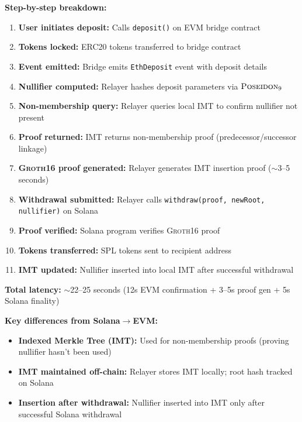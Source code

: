 \documentclass[11pt,a4paper,twoside]{article}
\newcommand{\poseidon}{\textsc{Poseidon}}
\newcommand{\groth}{\textsc{Groth16}}
\begin{document}
\textbf{Step-by-step breakdown:}
\begin{enumerate}
    \item \textbf{User initiates deposit:} Calls \texttt{deposit()} on EVM bridge contract
    \item \textbf{Tokens locked:} ERC20 tokens transferred to bridge contract
    \item \textbf{Event emitted:} Bridge emits \texttt{EthDeposit} event with deposit details
    \item \textbf{Nullifier computed:} Relayer hashes deposit parameters via $\poseidon_9$
    \item \textbf{Non-membership query:} Relayer queries local IMT to confirm nullifier not present
    \item \textbf{Proof returned:} IMT returns non-membership proof (predecessor/successor linkage)
    \item \textbf{\groth{} proof generated:} Relayer generates IMT insertion proof ($\sim$3--5 seconds)
    \item \textbf{Withdrawal submitted:} Relayer calls \texttt{withdraw(proof, newRoot, nullifier)} on Solana
    \item \textbf{Proof verified:} Solana program verifies \groth{} proof
    \item \textbf{Tokens transferred:} SPL tokens sent to recipient address
    \item \textbf{IMT updated:} Nullifier inserted into local IMT after successful withdrawal
\end{enumerate}

\textbf{Total latency:} $\sim$22--25 seconds (12s EVM confirmation + 3--5s proof gen + 5s Solana finality)

\textbf{Key differences from Solana$\rightarrow$EVM:}
\begin{itemize}
    \item \textbf{Indexed Merkle Tree (IMT):} Used for non-membership proofs (proving nullifier hasn't been used)
    \item \textbf{IMT maintained off-chain:} Relayer stores IMT locally; root hash tracked on Solana
    \item \textbf{Insertion after withdrawal:} Nullifier inserted into IMT only after successful Solana withdrawal
\end{itemize}

\end{document}
